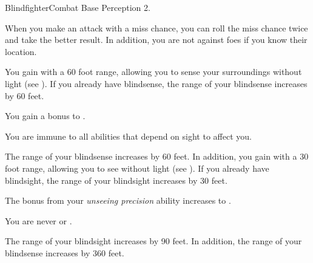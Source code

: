     \begin{feat}{Blindfighter}{Combat}
        \featpre Base Perception 2.

         When you make an attack with a miss chance, you can roll the miss chance twice and take the better result.
        In addition, you are not \partiallyunaware against foes if you know their location.

         You gain  with a 60 foot range, allowing you to sense your surroundings without light (see ).
        If you already have blindsense, the range of your blindsense increases by 60 feet.

         You gain a  bonus to .

         You are immune to all abilities that depend on sight to affect you.

         The range of your blindsense increases by 60 feet.
        In addition, you gain  with a 30 foot range, allowing you to see without light (see ).
        If you already have blindsight, the range of your blindsight increases by 30 feet.

         The bonus from your \textit{unseeing precision} ability increases to .

         You are never \unaware or \partiallyunaware.

         The range of your blindsight increases by 90 feet.
        In addition, the range of your blindsense increases by 360 feet.
    \end{feat}

